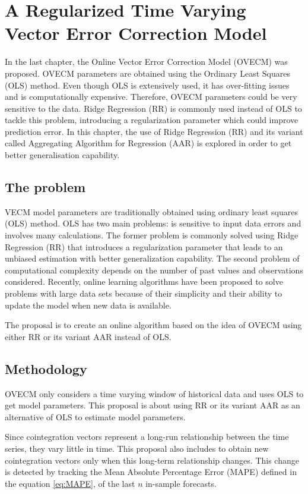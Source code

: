 \chapter{A Regularized Time Varying Vector Error Correction Model}

In the last chapter, the Online Vector Error Correction Model (OVECM) was
proposed. OVECM parameters are obtained using the Ordinary Least Squares (OLS)
method. Even though OLS is extensively used, it has over-fitting issues and is
computationally expensive. Therefore, OVECM parameters could be very sensitive
to the data. Ridge Regression (RR) is commonly used instead of OLS to tackle
this problem, introducing a regularization parameter which could improve
prediction error. In this chapter, the use of Ridge Regression (RR) and its
variant called Aggregating Algorithm for Regression (AAR) is explored in order
to get better generalisation capability. 

\section{The problem}

VECM model parameters are traditionally obtained using ordinary least squares
(OLS) method. OLS has two main problems: is sensitive to input data errors
and involves many calculations. The former problem is commonly solved using
Ridge Regression (RR) \cite{hoerl1970} that introduces a regularization
parameter that leads to an unbiased estimation with better generalization
capability. The second problem of computational complexity depends on the number
of past values and observations considered.  Recently, online learning
algorithms have been proposed to solve problems with large data sets because of
their simplicity and their ability to update the model when new data is
available. 

The proposal is to create an online algorithm based on the idea of OVECM
using either RR or its variant AAR instead of OLS. 


\section{Methodology}

OVECM only considers a time varying window of historical data and uses OLS to
get model parameters. This proposal is about using RR or its variant AAR
as an alternative of OLS to estimate model parameters.

Since cointegration vectors represent a long-run relationship between the time
series, they vary little in time. This proposal also includes to obtain new
cointegration vectors only when this long-term relationship changes. This change
is detected by tracking the Mean Absolute Percentage Error (MAPE) defined in the
equation \ref{eq:MAPE}, of the last $n$ in-sample forecasts.


